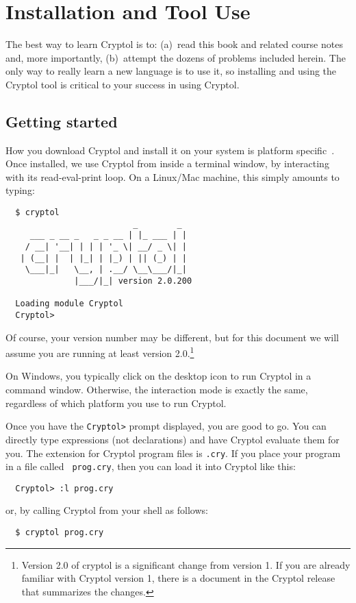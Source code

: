 
\chapter{Installation and Tool Use}
\label{cha:inst-tool-use}

The best way to learn Cryptol is to: (a)~read this book and related
course notes and, more importantly, (b)~attempt the dozens of problems
included herein.  The only way to really learn a new language is to
use it, so installing and using the Cryptol tool is critical to your
success in using Cryptol.

\section{Getting started}
\label{sec:gettingstarted}

How you download Cryptol and install it on your system is platform
specific~\cite{CryptolWWW}.  Once installed, we use Cryptol from
inside a terminal window, by interacting with its read-eval-print
loop. On a Linux/Mac machine, this simply amounts to typing:
\begin{Verbatim}
  $ cryptol
                          _        _
     ___ _ __ _   _ _ __ | |_ ___ | |
    / __| '__| | | | '_ \| __/ _ \| |
   | (__| |  | |_| | |_) | || (_) | |
    \___|_|   \__, | .__/ \__\___/|_|
              |___/|_| version 2.0.200

  Loading module Cryptol
  Cryptol>
\end{Verbatim}

\noindent Of course, your version number may be different, but for
this document we will assume you are running at least version
2.0.\footnote{Version 2.0 of cryptol is a significant change from
  version 1. If you are already familiar with Cryptol version 1, there
  is a document in the Cryptol release that summarizes the changes.}

On Windows, you typically click on the desktop icon to run Cryptol in
a command window.  Otherwise, the interaction mode is exactly the
same, regardless of which platform you use to run Cryptol.

Once you have the {\tt Cryptol>} prompt displayed, you are good to go.
You can directly type expressions (not declarations) and have Cryptol
evaluate them for you.  The extension for Cryptol program files is
{\tt .cry}.  If you place your program in a file called {\tt
  prog.cry}, then you can load it into Cryptol like this:
\begin{Verbatim}
  Cryptol> :l prog.cry
\end{Verbatim}
\noindent or, by calling Cryptol from your shell as follows:
\begin{Verbatim}
  $ cryptol prog.cry
\end{Verbatim}

